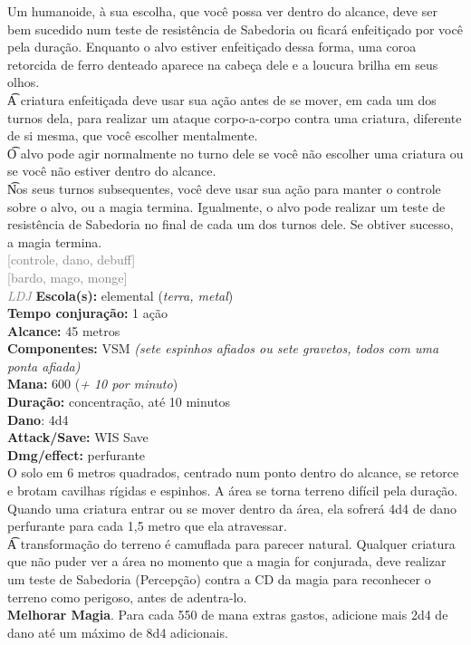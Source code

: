 \documentclass{RPG_Adventure}[2021/10/20]
\begin{document}
{\normalsize Um humanoide, à sua escolha, que você possa ver dentro do alcance, deve ser bem sucedido num teste de resistência de Sabedoria ou ficará enfeitiçado por você pela duração. Enquanto o alvo estiver enfeitiçado dessa forma, uma coroa retorcida de ferro denteado aparece na cabeça dele e a loucura brilha em seus olhos.\\\t A criatura enfeitiçada deve usar sua ação antes de se mover, em cada um dos turnos dela, para realizar um ataque corpo-a-corpo contra uma criatura, diferente de si mesma, que você escolher mentalmente.\\\t O alvo pode agir normalmente no turno dele se você não escolher uma criatura ou se você não estiver dentro do alcance.\\\t Nos seus turnos subsequentes, você deve usar sua ação para manter o controle sobre o alvo, ou a magia termina. Igualmente, o alvo pode realizar um teste de resistência de Sabedoria no final de cada um dos turnos dele. Se obtiver sucesso, a magia termina.\\}
{\scriptsize \textcolor{gray}{[controle, dano, debuff]\\}}
{\scriptsize \textcolor{gray}{[bardo, mago, monge]\\}}
{\tiny \textcolor{gray}{\textit{LDJ}}}
{\small \t \textbf{Escola(s):} elemental (\textit{terra, metal})\\\t \textbf{Tempo conjuração:} 1 ação\\\t \textbf{Alcance:} 45 metros\\\t \textbf{Componentes:} VSM \textit{(sete espinhos afiados ou sete gravetos, todos com uma ponta afiada)}\\\t \textbf{Mana:} 600 (\textit{+ 10 por minuto})\\\t \textbf{Duração:} concentração, até 10 minutos\\\t \textbf{Dano}: 4d4\\\t \textbf{Attack/Save:} WIS Save\\\t \textbf{Dmg/effect:} perfurante\\}
{\normalsize O solo em 6 metros quadrados, centrado num ponto dentro do alcance, se retorce e brotam cavilhas rígidas e espinhos. A área se torna terreno difícil pela duração. Quando uma criatura entrar ou se mover dentro da área, ela sofrerá 4d4 de dano perfurante para cada 1,5 metro que ela atravessar.\\\t A transformação do terreno é camuflada para parecer natural. Qualquer criatura que não puder ver a área no momento que a magia for conjurada, deve realizar um teste de Sabedoria (Percepção) contra a CD da magia para reconhecer o terreno como perigoso, antes de adentra-lo.\\\t \textbf{Melhorar Magia}. Para cada 550 de mana extras gastos, adicione mais 2d4 de dano até um máximo de 8d4 adicionais.\\}
\end{document}
